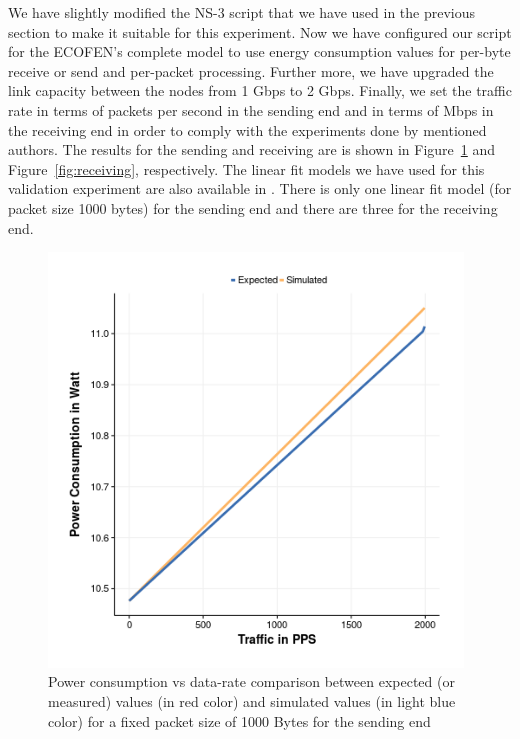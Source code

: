 We have slightly modified the NS-3 script that we have used in the previous section to make it suitable for this experiment. Now we have configured our script for the ECOFEN's complete model to use energy consumption values for per-byte receive or send and per-packet processing. Further more, we have upgraded the link capacity between the nodes from 1 Gbps to 2 Gbps. Finally, we set the traffic rate in terms of packets per second in the sending end and in terms of Mbps in the receiving end in order to comply with the experiments done by mentioned authors. The results for the sending and receiving are is shown in Figure~\ref{fig:sending} and Figure~\ref{fig:receiving}, respectively. The linear fit models we have used for this validation experiment are also available in \cite{Sivaraman}. There is only one linear fit model (for packet size 1000 bytes) for the sending end and there are three for the receiving end.   
\begin{figure}[ht]
	\begin{center}
		\includegraphics[width=11cm]{images/expectedvssimulatedsending.png}
		\caption{Power consumption vs data-rate comparison between expected (or measured) values (in red color) and simulated values (in light blue color) for a fixed packet size of 1000 Bytes for the sending end}
		\label{fig:sending}
	\end{center}
\end{figure}

